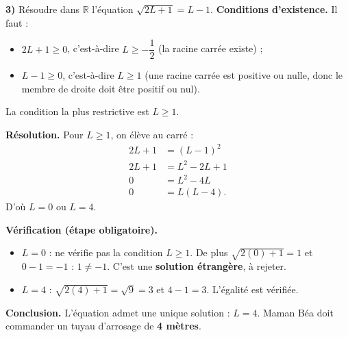 \documentclass[11pt]{article}
\begin{document}
\begin{exoresolu}
\textbf{3)} Résoudre dans $\mathbb{R}$ l'équation $\sqrt{2L+1} = L - 1$.
\tcblower
\textbf{Conditions d'existence.} Il faut :
\begin{itemize}
\item $2L + 1 \geq 0$, c'est-à-dire $L \geq -\dfrac{1}{2}$ (la racine carrée existe) ;
\item $L - 1 \geq 0$, c'est-à-dire $L \geq 1$ (une racine carrée est positive ou nulle, donc le membre de droite doit être positif ou nul).
\end{itemize}
La condition la plus restrictive est $L \geq 1$.

\textbf{Résolution.} Pour $L \geq 1$, on élève au carré :
\begin{align*}
2L + 1 &= (L-1)^2 \\
2L + 1 &= L^2 - 2L + 1 \\
0 &= L^2 - 4L \\
0 &= L(L - 4).
\end{align*}
D'où $L = 0$ ou $L = 4$.

\textbf{Vérification (étape obligatoire).}
\begin{itemize}
\item $L = 0$ : ne vérifie pas la condition $L \geq 1$. De plus $\sqrt{2(0)+1} = 1$ et $0 - 1 = -1$ : $1 \neq -1$. C'est une \textbf{solution étrangère}, à rejeter.
\item $L = 4$ : $\sqrt{2(4)+1} = \sqrt{9} = 3$ et $4 - 1 = 3$. L'égalité est vérifiée.
\end{itemize}

\textbf{Conclusion.} L'équation admet une unique solution : $L = 4$. Maman Béa doit commander un tuyau d'arrosage de \textbf{4 mètres}.
\end{exoresolu}
\end{document}
